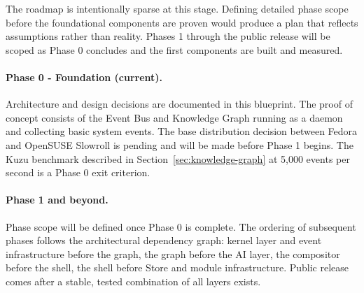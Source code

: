 The roadmap is intentionally sparse at this stage. Defining detailed phase
scope before the foundational components are proven would produce a plan that
reflects assumptions rather than reality. Phases 1 through the public release
will be scoped as Phase 0 concludes and the first components are built and
measured.

\paragraph{Phase 0 - Foundation (current).}
Architecture and design decisions are documented in this blueprint. The proof
of concept consists of the Event Bus and Knowledge Graph running as a daemon
and collecting basic system events. The base distribution decision between
Fedora and OpenSUSE Slowroll is pending and will be made before Phase 1 begins.
The Kuzu benchmark described in Section~\ref{sec:knowledge-graph} at 5,000
events per second is a Phase 0 exit criterion.

\paragraph{Phase 1 and beyond.}
Phase scope will be defined once Phase 0 is complete. The ordering of
subsequent phases follows the architectural dependency graph: kernel layer and
event infrastructure before the graph, the graph before the AI layer, the
compositor before the shell, the shell before Store and module infrastructure.
Public release comes after a stable, tested combination of all layers exists.
